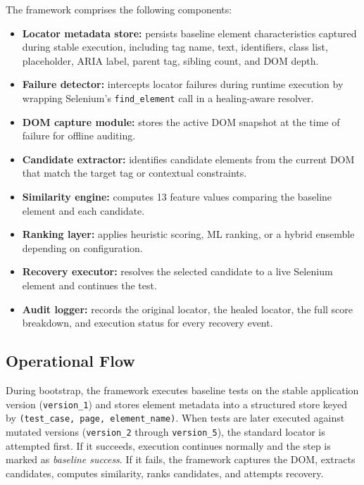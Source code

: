 \documentclass[12pt]{article}
\begin{document}
The framework comprises the following components:

\begin{itemize}[leftmargin=1.2em]
    \item \textbf{Locator metadata store:} persists baseline element characteristics captured during stable execution, including tag name, text, identifiers, class list, placeholder, ARIA label, parent tag, sibling count, and DOM depth.
    \item \textbf{Failure detector:} intercepts locator failures during runtime execution by wrapping Selenium's \texttt{find\_element} call in a healing-aware resolver.
    \item \textbf{DOM capture module:} stores the active DOM snapshot at the time of failure for offline auditing.
    \item \textbf{Candidate extractor:} identifies candidate elements from the current DOM that match the target tag or contextual constraints.
    \item \textbf{Similarity engine:} computes 13 feature values comparing the baseline element and each candidate.
    \item \textbf{Ranking layer:} applies heuristic scoring, ML ranking, or a hybrid ensemble depending on configuration.
    \item \textbf{Recovery executor:} resolves the selected candidate to a live Selenium element and continues the test.
    \item \textbf{Audit logger:} records the original locator, the healed locator, the full score breakdown, and execution status for every recovery event.
\end{itemize}

\subsection{Operational Flow}

During bootstrap, the framework executes baseline tests on the stable application version (\texttt{version\_1}) and stores element metadata into a structured store keyed by \texttt{(test\_case, page, element\_name)}. When tests are later executed against mutated versions (\texttt{version\_2} through \texttt{version\_5}), the standard locator is attempted first. If it succeeds, execution continues normally and the step is marked as \emph{baseline success}. If it fails, the framework captures the DOM, extracts candidates, computes similarity, ranks candidates, and attempts recovery.
\end{document}
